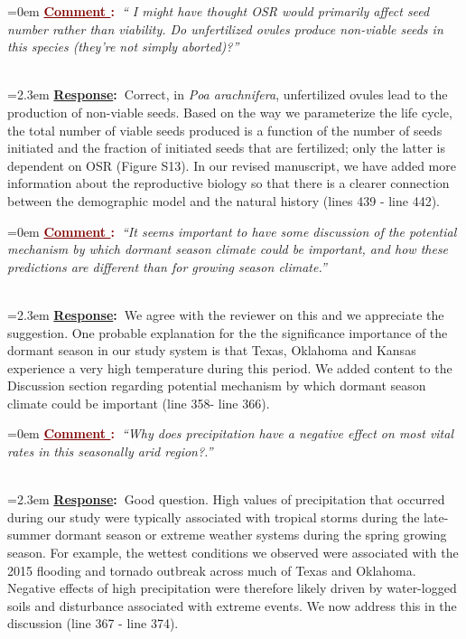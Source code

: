 \documentclass[12pt]{article}
\newcounter{cN}
\newcommand{\comment}[1]{
	\vspace{2em}
	\refstepcounter{cN} %
	\noindent \hangindent=0em \textbf{\textcolor{Maroon}{\uline{Comment \thecN}:~}}\emph{``#1''}
	}
\newcommand{\response}[1]{
	\\[0.25em]
	\hangindent=2.3em \textbf{\textcolor{NavyBlue}{\uline{Response}:~}}#1
	}
\begin{document}
\comment{ I might have thought OSR would primarily affect seed number rather than viability. Do unfertilized ovules produce non-viable seeds in this species (they’re not simply aborted)?}
\response{Correct, in \emph{Poa arachnifera}, unfertilized ovules lead to the production of non-viable seeds. 
Based on the way we parameterize the life cycle, the total number of viable seeds produced is a function of the number of seeds initiated and the fraction of initiated seeds that are fertilized; only the latter is dependent on OSR (Figure S13). 
In our revised manuscript, we have added more information about the reproductive biology so that there is a clearer connection between the demographic model and the natural history (lines 439 - line 442). }

\comment{It seems important to have some discussion of the potential mechanism by which dormant season climate could be important, and how these predictions are different than for growing season climate.}
\response{We agree with the reviewer on this and we appreciate the suggestion.  
One probable explanation for the the significance importance of the dormant season in our study system is that Texas, Oklahoma and Kansas experience a very high  temperature during  this period.
We added content to the Discussion section regarding potential mechanism by which dormant season climate could be important (line  358- line 366).}

\comment{Why does precipitation have a negative effect on most vital rates in this seasonally arid region?.}
\response{Good question. High values of precipitation that occurred during our study were typically associated with tropical storms during the late-summer dormant season or extreme weather systems during the spring growing season. 
For example, the wettest conditions we observed were associated with the 2015 flooding and tornado outbreak across much of Texas and Oklahoma. 
Negative effects of high precipitation were therefore likely driven by water-logged soils and disturbance associated with extreme events. 
We now address this in the discussion (line 367 - line 374).
}
\end{document}
